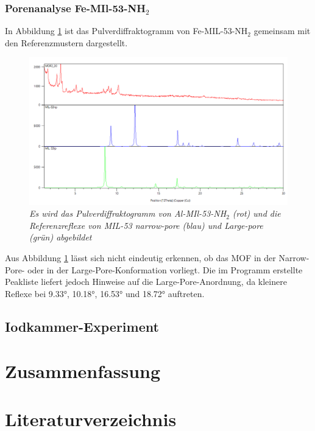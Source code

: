 \documentclass[12pt, a4paper]{article}
\begin{document}
\newpage

\subsubsection{\texorpdfstring{Porenanalyse Fe-MIl-53-NH$_2$}{Porenanalyse Fe-MIl-53-NH2}}
In Abbildung \ref{MOF220ver} ist das Pulverdiffraktogramm von Fe-MIL-53-NH$_2$ gemeinsam mit den Referenzmustern dargestellt. 

\begin{figure}[!h]
    \centering
    \includegraphics[scale=0.5]{MOF220ver.png}
    \caption{\textit{Es wird das Pulverdiffraktogramm von Al-MIl-53-NH$_2$ (rot) und die Referenzreflexe von MIL-53 narrow-pore (blau) und Large-pore (grün) abgebildet}}
    \label{MOF220ver}
\end{figure}
\noindent
Aus Abbildung \ref{MOF220ver} lässt sich nicht eindeutig erkennen, ob das MOF in der Narrow-Pore- oder in der Large-Pore-Konformation vorliegt. Die im Programm erstellte 
Peakliste liefert jedoch Hinweise auf die Large-Pore-Anordnung, da kleinere Reflexe bei 9.33°, 10.18°, 16.53° und 18.72° auftreten.
\newpage
\subsection{Iodkammer-Experiment}




\newpage
\section{Zusammenfassung}



\newpage
\section{Literaturverzeichnis}
\printbibliography
\end{document}
